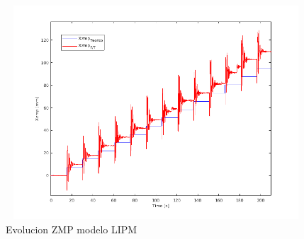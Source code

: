 \begin{figure}[H]
\centering
\includegraphics[width=13cm, height=8cm]{imagenes/apartado_5/5.1/53_evolucion_zmp_lipm}
\caption{Evolucion ZMP modelo LIPM}
\label{figura53}
\end{figure}

